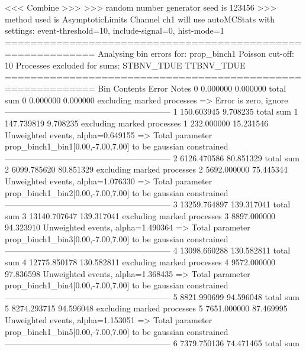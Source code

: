  <<< Combine >>> 
>>> random number generator seed is 123456
>>> method used is AsymptoticLimits
Channel ch1 will use autoMCStats with settings: event-threshold=10, include-signal=0, hist-mode=1
============================================================
Analysing bin errors for: prop_binch1
Poisson cut-off: 10
Processes excluded for sums: STBNV_TDUE TTBNV_TDUE
============================================================
Bin        Contents        Error           Notes                         
0          0.000000        0.000000        total sum                     
0          0.000000        0.000000        excluding marked processes    
  => Error is zero, ignore      
------------------------------------------------------------
1          150.603945      9.708235        total sum                     
1          147.739819      9.708235        excluding marked processes    
1          232.000000      15.231546       Unweighted events, alpha=0.649155
  => Total parameter prop_binch1_bin1[0.00,-7.00,7.00] to be gaussian constrained
------------------------------------------------------------
2          6126.470586     80.851329       total sum                     
2          6099.785620     80.851329       excluding marked processes    
2          5692.000000     75.445344       Unweighted events, alpha=1.076330
  => Total parameter prop_binch1_bin2[0.00,-7.00,7.00] to be gaussian constrained
------------------------------------------------------------
3          13259.764897    139.317041      total sum                     
3          13140.707647    139.317041      excluding marked processes    
3          8897.000000     94.323910       Unweighted events, alpha=1.490364
  => Total parameter prop_binch1_bin3[0.00,-7.00,7.00] to be gaussian constrained
------------------------------------------------------------
4          13098.660288    130.582811      total sum                     
4          12775.850178    130.582811      excluding marked processes    
4          9572.000000     97.836598       Unweighted events, alpha=1.368435
  => Total parameter prop_binch1_bin4[0.00,-7.00,7.00] to be gaussian constrained
------------------------------------------------------------
5          8821.990699     94.596048       total sum                     
5          8274.293715     94.596048       excluding marked processes    
5          7651.000000     87.469995       Unweighted events, alpha=1.153051
  => Total parameter prop_binch1_bin5[0.00,-7.00,7.00] to be gaussian constrained
------------------------------------------------------------
6          7379.750136     74.471465       total sum                     
